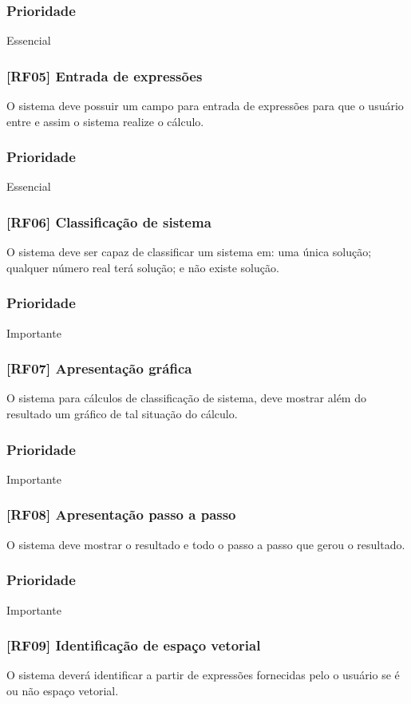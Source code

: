 \documentclass{scrreprt}
\begin{document}
\subsubsection{Prioridade}
Essencial

\subsubsection{[RF05] Entrada de expressões}
O sistema deve possuir um campo para entrada de expressões para que o usuário entre e assim o sistema realize o cálculo.
\subsubsection{Prioridade}
Essencial

\subsubsection{[RF06] Classificação de sistema}
O sistema deve ser capaz de classificar um sistema em: uma única solução; qualquer número real terá solução; e não existe solução.
\subsubsection{Prioridade}
Importante

\subsubsection{[RF07] Apresentação gráfica}
O sistema para cálculos de classificação de sistema, deve mostrar além do resultado um gráfico de tal situação do cálculo.
\subsubsection{Prioridade}
Importante

\subsubsection{[RF08] Apresentação passo a passo}
O sistema deve mostrar o resultado e todo o passo a passo que gerou o resultado.
\subsubsection{Prioridade}
Importante

\subsubsection{[RF09] Identificação de espaço vetorial}
O sistema deverá identificar a partir de expressões fornecidas pelo o usuário se é ou não espaço vetorial.
\end{document}
